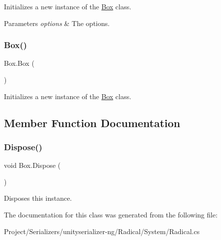 Initializes a new instance of the \hyperlink{class_box}{Box} class. 


\begin{DoxyParams}{Parameters}
{\em options} & The options.\\
\hline
\end{DoxyParams}
\mbox{\label{class_box_ad53a682f16ccaa51b35b9b5bd2ba8ce5}} 
\subsubsection{\texorpdfstring{Box()}{Box()}\hspace{0.1cm}{\footnotesize\ttfamily [3/3]}}
{\footnotesize\ttfamily Box.\+Box (\begin{DoxyParamCaption}{ }\end{DoxyParamCaption})\hspace{0.3cm}{\ttfamily [inline]}}



Initializes a new instance of the \hyperlink{class_box}{Box} class. 



\subsection{Member Function Documentation}
\mbox{\label{class_box_ac9ce247b8a06dc8f0b3bea024ef51956}} 
\subsubsection{\texorpdfstring{Dispose()}{Dispose()}}
{\footnotesize\ttfamily void Box.\+Dispose (\begin{DoxyParamCaption}{ }\end{DoxyParamCaption})\hspace{0.3cm}{\ttfamily [inline]}}



Disposes this instance. 



The documentation for this class was generated from the following file\+:\begin{DoxyCompactItemize}
\item 
Project/\+Serializers/unityserializer-\/ng/\+Radical/\+System/Radical.\+cs\end{DoxyCompactItemize}
